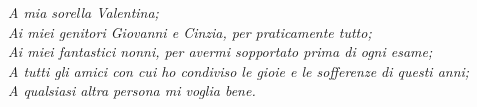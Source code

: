 \begin{flushright}
    \textit{
        A mia sorella Valentina; \\
        Ai miei genitori Giovanni e Cinzia, per praticamente tutto; \\
        Ai miei fantastici nonni, per avermi sopportato prima di ogni esame; \\
        A tutti gli amici con cui ho condiviso le gioie e le sofferenze di questi anni; \\
        A qualsiasi altra persona mi voglia bene.
    }
\end{flushright}
